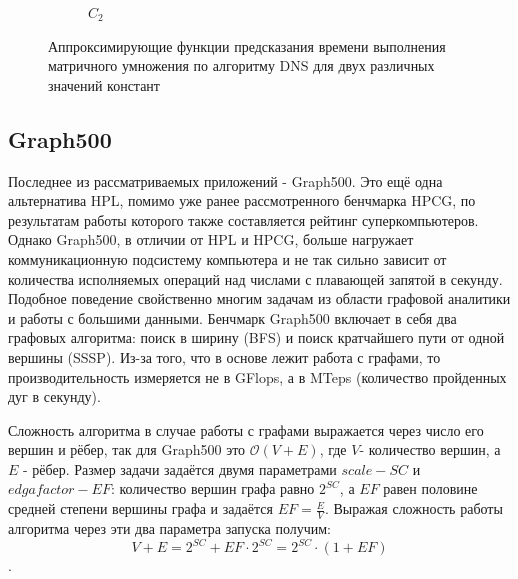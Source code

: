 \begin{figure}
\begin{subfigure}{.5\textwidth}
				\caption{\(C_2\)}
				\label{graph_C_2_DNS}
			\end{subfigure}
			\caption{Аппроксимирующие функции предсказания времени выполнения матричного умножения по алгоритму DNS для двух различных значений констант}
			\label{graph_DNS}
			\end{figure}

	\subsection{Graph500}
		Последнее из рассматриваемых приложений - Graph500. Это ещё одна альтернатива HPL, помимо уже ранее рассмотренного бенчмарка HPCG, по результатам работы которого также составляется рейтинг суперкомпьютеров. Однако Graph500, в отличии от HPL и HPCG, больше нагружает коммуникационную подсистему компьютера и не так сильно зависит от количества исполняемых операций над числами с плавающей запятой в секунду. Подобное поведение свойственно многим задачам из области графовой аналитики и работы с большими данными. Бенчмарк Graph500 включает в себя два графовых алгоритма: поиск в ширину (BFS) и поиск кратчайшего пути от одной вершины (SSSP). Из-за того, что в основе лежит работа с графами, то производительность измеряется не в GFlops, а в MTeps (количество пройденных дуг в секунду).

		Сложность алгоритма в случае работы с графами выражается через число его вершин и рёбер, так для Graph500 это \(\mathcal{O}(V + E)\), где \(V\)- количество вершин, а \(E\) - рёбер. Размер задачи задаётся двумя параметрами \(scale - SC\) и \(edgafactor - EF\): количество вершин графа равно \(2^{SC}\), а \(EF\) равен половине средней степени вершины графа и задаётся \(EF = \frac{E}{V}\). Выражая сложность работы алгоритма через эти два параметра запуска получим: \[V + E = 2^{SC} + EF \cdot 2^{SC} = 2^{SC} \cdot (1 + EF) \].

